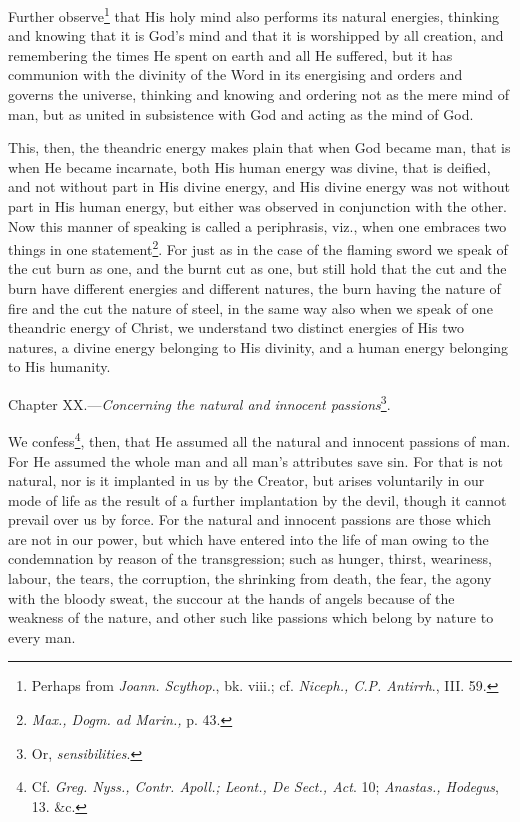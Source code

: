 Further observe\footnote{Perhaps from \emph{Joann. Scythop}., bk. viii.; cf. \emph{Niceph., C.P. Antirrh}., III. 59.} that His holy mind also performs its natural energies, thinking and knowing that it is God’s mind and that it is worshipped by all creation, and remembering the times He spent on earth and all He suffered, but it has communion with the divinity of the Word in its energising and orders and governs the universe, thinking and knowing and ordering not as the mere mind of man, but as united in subsistence with God and acting as the mind of God.

This, then, the theandric energy makes plain that when God became man, that is when He became incarnate, both His human energy was divine, that is deified, and not without part in His divine energy, and His divine energy was not without part in His human energy, but either was observed in conjunction with the other. Now this manner of speaking is called a periphrasis, viz., when one embraces two things in one statement\footnote{\emph{Max., Dogm. ad Marin., }p. 43.}. For just as in the case of the flaming sword we speak of the cut burn as one, and the burnt cut as one, but still hold that the cut and the burn have different energies and different natures, the burn having the nature of fire and the cut the nature of steel, in the same way also when we speak of one theandric energy of Christ, we understand two distinct energies of His two natures, a divine energy belonging to His divinity, and a human energy belonging to His humanity.


Chapter XX.—\emph{Concerning the natural and innocent passions}\footnote{Or, \emph{sensibilities}.}.

We confess\footnote{Cf. \emph{Greg. Nyss., Contr. Apoll.; Leont., De Sect., Act}. 10; \emph{Anastas., Hodegus}, 13. \&c.}, then, that He assumed all the natural and innocent passions of man. For He assumed the whole man and all man’s attributes save sin. For that is not natural, nor is it implanted in us by the Creator, but arises voluntarily in our mode of life as the result of a further implantation by the devil, though it cannot prevail over us by force. For the natural and innocent passions are those which are not in our power, but which have entered into the life of man owing to the condemnation by reason of the transgression; such as hunger, thirst, weariness, labour, the tears, the corruption, the shrinking from death, the fear, the agony with the bloody sweat, the succour at the hands of angels because of the weakness of the nature, and other such like passions which belong by nature to every man.

